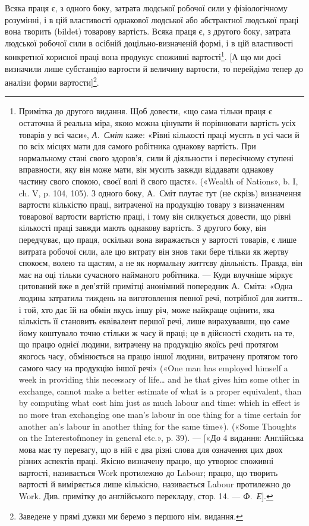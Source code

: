 Всяка праця є, з одного боку, затрата людської робочої сили
у фізіологічному розумінні, і в цій властивості однакової людської
або абстрактної людської праці вона творить (bildet) товарову
вартість. Всяка праця є, з другого боку, затрата людської робочої
сили в осібній доцільно-визначеній формі, і в цій властивості
конкретної корисної праці вона продукує споживні вартості\footnote{
Примітка до другого видання. Щоб довести, «що сама тільки праця є
остаточна й реальна міра, якою можна цінувати й порівнювати вартість
усіх товарів у всі часи», \emph{А.~Сміт} каже: «Рівні кількості праці мусять в
усі часи й по всіх місцях мати для самого робітника однакову вартість.
При нормальному стані свого здоров'я, сили й діяльности і пересічному
ступені вправности, яку він може мати, він мусить завжди віддавати однакову
частину свого спокою, своєї волі й свого щастя». («Wealth of Nations»,
b. I, ch. V, p. 104, 105). З одного боку, А.~Сміт плутає тут (не скрізь)
визначення вартости кількістю праці, витраченої на продукцію товару
з визначенням товарової вартости вартістю праці, і тому він силкується
довести, що рівні кількості праці завжди мають однакову вартість. З другого
боку, він передчуває, що праця, оскільки вона виражається у вартості
товарів, є лише витрата робочої сили, але цю витрату він знов таки
бере тільки як жертву спокоєм, волею та щастям, а не як нормальну життєву
діяльність. Правда, він має на оці тільки сучасного найманого робітника.
— Куди влучніше міркує цитований вже в дев’ятій примітці анонімний
попередник А.~Сміта: «Одна людина затратила тиждень на виготовлення
певної речі, потрібної для життя\dots{} і той, хто дає їй на обмін якусь
іншу річ, може найкраще оцінити, яка кількість її становить еквівалент
першої речі, лише вирахувавши, що саме йому коштувало точно стільки ж
часу й праці; це в дійсності сходить на те, що працю однієї людини, витрачену
на продукцію якоїсь речі протягом якогось часу, обмінюється
на працю іншої людини, витрачену протягом того самого часу на продукцію
іншої речі» («One man has employed himself a week in providing this
necessary of life\dots{} and he that gives him some other in exchange, cannot
make a better estimate of what is a proper equivalent, than by computing what
cost him just as much labour and time: which in effect is no more tran exchanging
one man’s labour in one thing for a time certain for another an’s labour
in another thing for the same time»). («Some Thoughts on the Interestofmoney
in general etc.», p. 39). — [«До 4 видання: Англійська мова має
ту перевагу, що в ній є два різні слова для означення цих двох різних аспектів
праці. Якісно визначену працю, що утворює споживні вартості,
називається Work протилежно до Labour; працю, що творить вартості
й виміряється лише кількісно, називається Labour протилежно до Work.
Див. примітку до англійського перекладу, стор. 14. — \emph{Ф.~Е}].}.
[А що ми досі визначили лише субстанцію вартости й величину
вартости, то перейдімо тепер до аналізи форми вартости]\footnote*{
Заведене у прямі дужки ми беремо з першого нім. видання. 
}.


